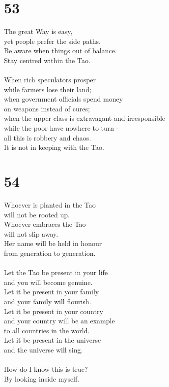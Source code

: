 \documentclass[b5paper, 12pt, oneside]{book}
\begin{document}
\chapter*{53}
The great Way is easy,\\
yet people prefer the side paths.\\
Be aware when things out of balance.\\
Stay centred within the Tao.\\
\\
When rich speculators prosper\\
while farmers lose their land;\\
when government officials spend money\\
on weapons instead of cures;\\
when the upper class is extravagant and irresponsible\\
while the poor have nowhere to turn - \\
all this is robbery and chaos.\\
It is not in keeping with the Tao.

\chapter*{54}
Whoever is planted in the Tao\\
will not be rooted up.\\
Whoever embraces the Tao\\
will not slip away.\\
Her name will be held in honour\\
from generation to generation.\\
\\
Let the Tao be present in your life\\
and you will become genuine.\\
Let it be present in your family\\
and your family will flourish.\\
Let it be present in your country\\
and your country will be an example\\
to all countries in the world.\\
Let it be present in the universe\\
and the universe will sing.\\
\\
How do I know this is true?\\
By looking inside myself.
\end{document}
